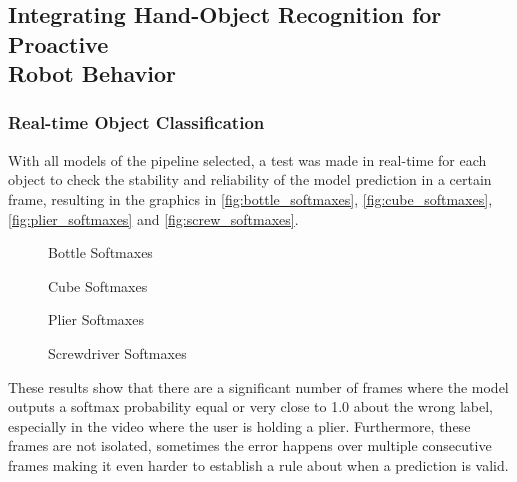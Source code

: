 \subsection{Integrating Hand-Object Recognition for Proactive\\Robot Behavior}

\subsubsection{Real-time Object Classification}

With all models of the pipeline selected, a test was made in real-time for each object to check the stability and reliability of the model prediction in a certain frame, resulting in the graphics in \autoref{fig:bottle_softmaxes}, \autoref{fig:cube_softmaxes}, \autoref{fig:plier_softmaxes} and \autoref{fig:screw_softmaxes}.

\begin{figure}[H]
    \centering
    {\fontsize{9}{11}\selectfont}
    \caption{Bottle Softmaxes}
    \label{fig:bottle_softmaxes}
\end{figure}

\begin{figure}[H]
    \centering
    {\fontsize{9}{11}\selectfont}
    \caption{Cube Softmaxes}
    \label{fig:cube_softmaxes}
\end{figure}

\begin{figure}[H]
    \centering
    {\fontsize{9}{11}\selectfont}
    \caption{Plier Softmaxes}
    \label{fig:plier_softmaxes}
\end{figure}

\begin{figure}[H]
    \centering
    {\fontsize{9}{11}\selectfont}
    \caption{Screwdriver Softmaxes}
    \label{fig:screw_softmaxes}
\end{figure}

These results show that there are a significant number of frames where the model outputs a softmax probability equal or very close to \num{1.0} about the wrong label, especially in the video where the user is holding a plier. Furthermore, these frames are not isolated, sometimes the error happens over multiple consecutive frames making it even harder to establish a rule about when a prediction is valid.

